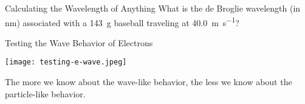 \documentclass[handout,notes=hide]{beamer}
\begin{document}
\begin{frame}[t]{Calculating the Wavelength of Anything}
	What is the de Broglie wavelength (in \si{\nano\meter}) associated with
	a \SI{143}{\gram} baseball traveling at \SI{40.0}{\meter\per\second}?

\end{frame}



\begin{frame}{Testing the Wave Behavior of Electrons}
	\begin{center}
		\texttt{[image: testing-e-wave.jpeg]}
	
		\pause
	
		\begin{alertenv}
			The more we know about the wave-like behavior, the less we
			know about the particle-like behavior.
		\end{alertenv}
	\end{center}
\end{frame}
\end{document}
